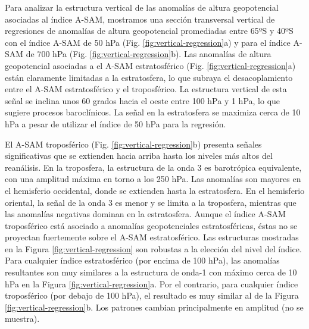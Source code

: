 \documentclass[12pt,oneside]{reedthesis}
\begin{document}
Para analizar la estructura vertical de las anomalías de altura geopotencial asociadas al índice A-SAM, mostramos una sección transversal vertical de regresiones de anomalías de altura geopotencial promediadas entre 65ºS y 40ºS con el índice A-SAM de 50 hPa (Fig. \ref{fig:vertical-regression}a) y para el índice A-SAM de 700 hPa (Fig. \ref{fig:vertical-regression}b).
Las anomalías de altura geopotencial asociadas a el A-SAM estratosférico (Fig. \ref{fig:vertical-regression}a) están claramente limitadas a la estratosfera, lo que subraya el desacoplamiento entre el A-SAM estratosférico y el troposférico.
La estructura vertical de esta señal se inclina unos 60 grados hacia el oeste entre 100 hPa y 1 hPa, lo que sugiere procesos baroclínicos.
La señal en la estratosfera se maximiza cerca de 10 hPa a pesar de utilizar el índice de 50 hPa para la regresión.

El A-SAM troposférico (Fig. \ref{fig:vertical-regression}b) presenta señales significativas que se extienden hacia arriba hasta los niveles más altos del reanálisis.
En la troposfera, la estructura de la onda 3 es barotrópica equivalente, con una amplitud máxima en torno a los 250 hPa.
Las anomalías son mayores en el hemisferio occidental, donde se extienden hasta la estratosfera.
En el hemisferio oriental, la señal de la onda 3 es menor y se limita a la troposfera, mientras que las anomalías negativas dominan en la estratosfera.
Aunque el índice A-SAM troposférico está asociado a anomalías geopotenciales estratosféricas, éstas no se proyectan fuertemente sobre el A-SAM estratosférico.
Las estructuras mostradas en la Figura \ref{fig:vertical-regression} son robustas a la elección del nivel del índice.
Para cualquier índice estratosférico (por encima de 100 hPa), las anomalías resultantes son muy similares a la estructura de onda-1 con máximo cerca de 10 hPa en la Figura \ref{fig:vertical-regression}a.
Por el contrario, para cualquier índice troposférico (por debajo de 100 hPa), el resultado es muy similar al de la Figura \ref{fig:vertical-regression}b.
Los patrones cambian principalmente en amplitud (no se muestra).
\end{document}
